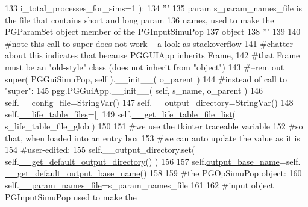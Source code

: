 \begin{DoxyCode}
133                             i\_total\_processes\_for\_sims=1 ):
134         \textcolor{stringliteral}{'''}
135 \textcolor{stringliteral}{        param s\_param\_names\_file is the file that contains short and long param}
136 \textcolor{stringliteral}{        names, used to make the PGParamSet object  member of the PGInputSimuPop }
137 \textcolor{stringliteral}{        object}
138 \textcolor{stringliteral}{        '''}
139 
140         \textcolor{comment}{#note this call to super does not work -- a look as stackoverflow}
141         \textcolor{comment}{#chatter about this indicates that because PGGUIApp inherits Frame,}
142         \textcolor{comment}{#that Frame must be an "old-style" class (does not inherit from "object")}
143         \textcolor{comment}{#--rem out super( PGGuiSimuPop, self ).\_\_init\_\_( o\_parent )}
144         \textcolor{comment}{#instead of call to "super":}
145         pgg.PGGuiApp.\_\_init\_\_( self, s\_name, o\_parent )
146         self.\hyperlink{classnegui_1_1pgguisimupop_1_1PGGuiSimuPop_accf4b1e619efda180dcd4795425f88c8}{\_\_config\_file}=StringVar()
147         self.\hyperlink{classnegui_1_1pgguisimupop_1_1PGGuiSimuPop_a8c3dba3a47984c6174e659458da1d4c6}{\_\_output\_directory}=StringVar()
148         self.\hyperlink{classnegui_1_1pgguisimupop_1_1PGGuiSimuPop_a1871547ce6fe9a86b10a30f3d7b41cdd}{\_\_life\_table\_files}=[]
149         self.\hyperlink{classnegui_1_1pgguisimupop_1_1PGGuiSimuPop_a12344f4fdce230b8fbb699dbd74c95a2}{\_\_get\_life\_table\_file\_list}( s\_life\_table\_file\_glob )
150 
151         \textcolor{comment}{#we use the tkinter traceable variable}
152         \textcolor{comment}{#so that, when loaded into an entry box}
153         \textcolor{comment}{#we can auto update the value as it is }
154         \textcolor{comment}{#user-edited:}
155         self.\_\_output\_directory.set( self.\hyperlink{classnegui_1_1pgguisimupop_1_1PGGuiSimuPop_abba3f28989d693eadf8d8dd181502d06}{\_\_get\_default\_output\_directory}() )
156 
157         self.\hyperlink{classnegui_1_1pgguisimupop_1_1PGGuiSimuPop_aa5f9f17f0527c20e5556b574a3f97300}{output\_base\_name}=self.
      \hyperlink{classnegui_1_1pgguisimupop_1_1PGGuiSimuPop_a55130312327d03aa8e37d827a46929db}{\_\_get\_default\_output\_base\_name}() 
158 
159         \textcolor{comment}{#the PGOpSimuPop object:}
160         self.\hyperlink{classnegui_1_1pgguisimupop_1_1PGGuiSimuPop_a53d091be0140a85e8c45a76c0b89c370}{\_\_param\_names\_file}=s\_param\_names\_file
161 
162         \textcolor{comment}{#input object PGInputSimuPop used to make the}

\end{DoxyCode}
